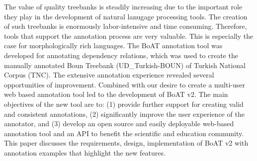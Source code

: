 
The value of quality treebanks is steadily increasing due to the important role they play in the development of natural lanugage processing tools.
The creation of such treebanks is enormously labor-intensive and time consuming. 
Therefore, tools that support the annotation process are very valuable. 
This is especially the case for morphologically rich languages. 
The BoAT annotation tool was developed for annotating dependency relations, which was used to create the manually annotated Boun Treebank (UD_Turkish-BOUN) of Turkish National Corpus (TNC). 
The extensive annotation experience revealed several opportunities of improvement.
Combined with our desire to create a multi-user web based annotation tool led to the development of BoAT v2. 
The main objectives of the new tool are to: (1) provide further support for creating valid and consistent annotations, (2) significantly improve the user experience of the annotator, and (3) develop an open source and easily deployable web-based annotation tool and an API to benefit the scientific and education community. 
This paper discusses the requirements, design, implementation of BoAT v2 with annotation examples that highlight the new features. 
